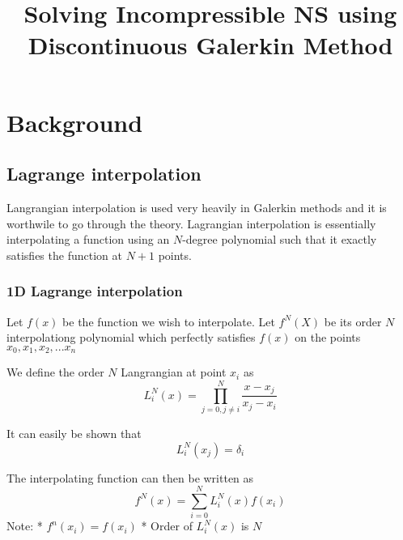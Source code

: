 \documentclass[11pt]{article}
\title{Solving Incompressible NS using Discontinuous Galerkin Method}
\begin{document}
    
    
    \maketitle
    
    

    

    \section{Background}\label{background}

\subsection{Lagrange interpolation}\label{lagrange-interpolation}

Langrangian interpolation is used very heavily in Galerkin methods and
it is worthwile to go through the theory. Lagrangian interpolation is
essentially interpolating a function using an \(N\)-degree polynomial
such that it exactly satisfies the function at \(N+1\) points.

\subsubsection{1D Lagrange
interpolation}\label{d-lagrange-interpolation}

Let \(f(x)\) be the function we wish to interpolate. Let \(f^N(X)\) be
its order \(N\) interpolationg polynomial which perfectly satisfies
\(f(x)\) on the points \(x_0, x_1, x_2, ... x_n\)

We define the order \(N\) Langrangian at point \(x_i\) as
\[L^N_i(x) = \prod_{j=0, j\neq i}^{N} \frac{x-x_j}{x_j-x_i}\]

It can easily be shown that \[L^N_i(x_j) = \delta_{i}\]

The interpolating function can then be written as
\[f^N(x) = \sum_{i=0}^{N}L_i^N(x)f(x_i)\] Note: * \(f^n(x_i) = f(x_i)\)
* Order of \(L_i^N(x)\) is \(N\)



    \begin{center}
    \end{center}
    { \hspace*{\fill} \\}
    
\end{document}
